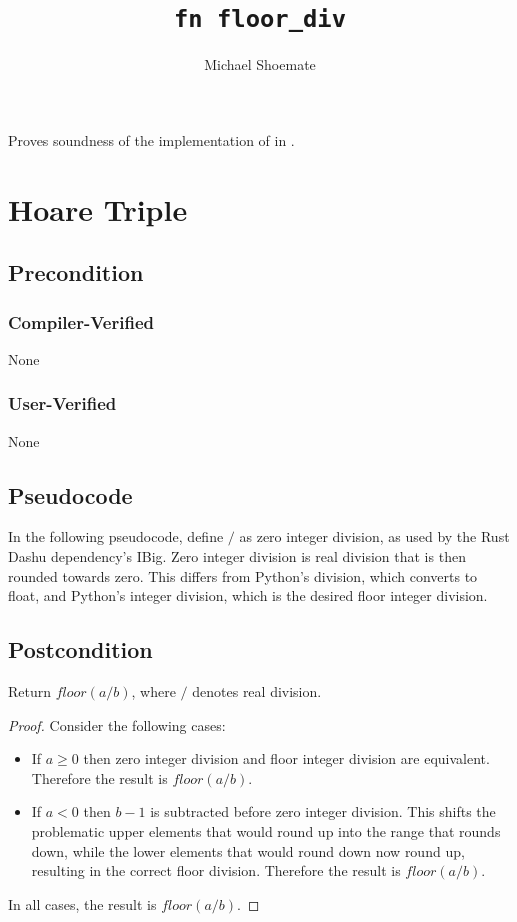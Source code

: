 \documentclass{article}
\title{\texttt{fn floor\_div}}
\author{Michael Shoemate}
\date{}
\begin{document}
\maketitle

\contrib
Proves soundness of the implementation of  in .

\section{Hoare Triple}
\subsection*{Precondition}
\subsubsection*{Compiler-Verified}
None

\subsubsection*{User-Verified}
None

\subsection*{Pseudocode}
In the following pseudocode, define $/$ as zero integer division, as used by the Rust Dashu dependency's IBig.
Zero integer division is real division that is then rounded towards zero.
This differs from Python's division, which converts to float,
and Python's integer division, which is the desired floor integer division.



\subsection*{Postcondition}
\begin{theorem}
    Return $floor(a / b)$, where $/$ denotes real division.
\end{theorem}

\begin{proof}
    Consider the following cases:
    \begin{itemize}
        \item If $a \geq 0$ then zero integer division and floor integer division are equivalent.
            Therefore the result is $floor(a / b)$.
        \item If $a < 0$ then $b - 1$ is subtracted before zero integer division.
            This shifts the problematic upper elements that would round up into the range that rounds down,
            while the lower elements that would round down now round up, resulting in the correct floor division.
            Therefore the result is $floor(a / b)$.
    \end{itemize}
    In all cases, the result is $floor(a / b)$.
\end{proof}
\end{document}
